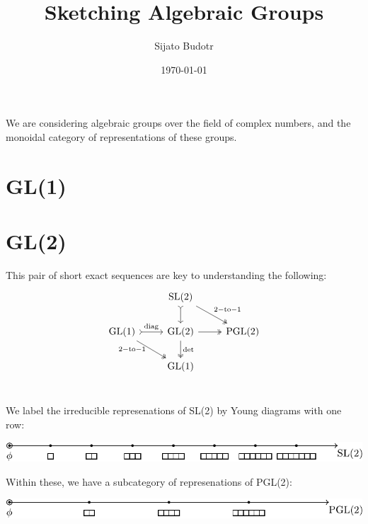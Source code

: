 \documentclass[11pt,oneside]{article}
\title{Sketching Algebraic Groups}
\author{Sijato Budotr}
\date{\today}
\newcommand{\GL}{\mathrm{GL}}
\newcommand{\SL}{\mathrm{SL}}
\newcommand{\PGL}{\mathrm{PGL}}
\begin{document}
\maketitle




We are considering algebraic groups over the field of
complex numbers, and the monoidal category of representations of 
these groups.

\section*{GL(1)}



\section*{GL(2)}

This pair of short exact sequences are key
to understanding the following:
\[
\begin{tikzcd}
    &  
    \SL(2) \arrow[rightarrowtail]{d}\arrow[two heads]{dr}{\mathrm{2-to-1}} &  \\
    \GL(1) \arrow[rightarrowtail]{r}{\mathrm{diag}} 
           \arrow[two heads]{dr}[below,left]{\mathrm{2-to-1\ }}  &  
    \GL(2) \arrow[two heads]{r}\arrow[two heads]{d}{\mathrm{det}}  &  \PGL(2)     \\
    &  \GL(1)             &     \\
\end{tikzcd}
\]


We label the irreducible represenations of SL(2) by
Young diagrams with one row:
\begin{center}
\includegraphics[]{images/sl2.pdf}
\end{center}

Within these, we have a subcategory of represenations of PGL(2):
\begin{center}
\includegraphics[]{images/pgl2.pdf}
\end{center}
\end{document}
